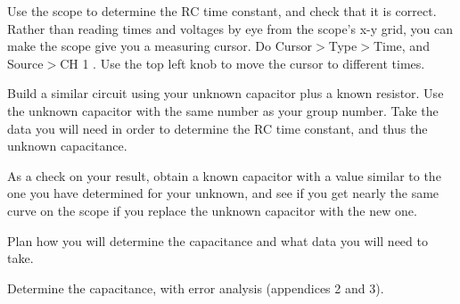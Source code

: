 Use the scope to determine the RC time constant, and
check that it is correct.
Rather than reading times and voltages by eye from the scope's x-y grid, you can make
the scope give you a measuring cursor. Do Cursor$>$Type$>$Time, and Source$>$CH 1 . Use the top
left knob to move the cursor to different times.



Build a similar circuit using your unknown capacitor plus a
known resistor. Use the unknown capacitor with the same
number as your group number. Take the data you will need in
order to determine the RC time constant, and thus the
unknown capacitance.

As a check on your result, obtain a known capacitor with a
value similar to the one you have determined for your
unknown, and see if you get nearly the same curve on the
scope if you replace the unknown capacitor with the new one.

\prelab

\prelabquestion  Plan how you will determine the capacitance and what
data you will need to take.

\analysis

Determine the capacitance, with error analysis (appendices 2 and 3).
